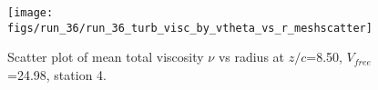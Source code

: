 \begin{figure}[H]
\centering
\texttt{[image: figs/run\_36/run\_36\_turb\_visc\_by\_vtheta\_vs\_r\_meshscatter]}
\caption{Scatter plot of mean total viscosity $\nu$ vs radius at $z/c$=8.50, $V_{free}$=24.98, station 4.}
\label{fig:run_36_turb_visc_by_vtheta_vs_r_meshscatter}
\end{figure}


